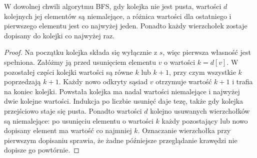 \begin{lemat}
\label{lem:tg-bfs-queue}
W dowolnej chwili algorytmu BFS, gdy kolejka nie jest pusta,
wartości $d$ kolejnych jej elementów są niemalejące,
a różnica wartości dla ostatniego i pierwszego elementu
jest co najwyżej jeden. Ponadto każdy wierzchołek zostaje
dopisany do kolejki co najwyżej raz.
\end{lemat}
\begin{proof}
Na początku kolejka składa się wyłącznie z $s$, więc
pierwsza własność jest spełniona. Załóżmy ją przed
usunięciem elementu $v$ o wartości $k=d[v]$.
W pozostałej części kolejki wartości są równe $k$
lub $k+1$, przy czym wszystkie $k$ poprzedzają $k+1$.
Każdy nowo odkryty sąsiad $v$ otrzymuje wartość $k+1$
i trafia na koniec kolejki. Powstała kolejka
ma nadal wartości niemalejące i najwyżej dwie
kolejne wartości. Indukcja po liczbie usunięć
daje tezę, także gdy kolejka przejściowo staje się pusta.
Ponadto wartości $d$ kolejno usuwanych wierzchołków są
niemalejące: po usunięciu elementu o wartości $k$
każdy pozostający lub nowo dopisany element ma wartość
co najmniej $k$.
Oznaczanie wierzchołka przy pierwszym dopisaniu sprawia,
że żadne późniejsze przeglądanie krawędzi nie dopisze go
powtórnie.
\end{proof}

